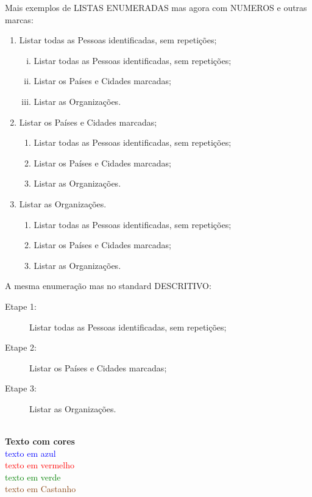 \documentclass[11pt,a4paper]{report}%
\begin{document}
Mais exemplos de LISTAS ENUMERADAS mas agora com NUMEROS e outras marcas:
\begin{enumerate}
\item Listar todas as Pessoas identificadas, sem repetições;
  \begin{enumerate}[i)]
     \item Listar todas as Pessoas identificadas, sem repetições;
     \item Listar os Países e Cidades marcadas;
     \item Listar as Organizações.\\ %
  \end{enumerate}
\item Listar os Países e Cidades marcadas;
  \begin{enumerate}[2.1)]
     \item Listar todas as Pessoas identificadas, sem repetições;
     \item Listar os Países e Cidades marcadas;
     \item Listar as Organizações.\\ %
  \end{enumerate}
\item Listar as Organizações.
    \begin{enumerate}[1)]
     \item Listar todas as Pessoas identificadas, sem repetições;
     \item Listar os Países e Cidades marcadas;
     \item Listar as Organizações.\\ %
  \end{enumerate}
\end{enumerate}

A mesma enumeração mas no standard DESCRITIVO:
\begin{description}
\item[Etape 1:] Listar todas as Pessoas identificadas, sem repetições;
\item[Etape 2:] Listar os Países e Cidades marcadas;
\item[Etape 3:] Listar as Organizações.\\\\
\end{description}


\textbf{Texto com cores}\\

\textcolor{blue}{texto em azul}\\
\textcolor{red}{texto em vermelho} \\
\textcolor{green}{texto em verde} \\
\textcolor{saddlebrown}{texto em Castanho} \\\\\\
\end{document}
